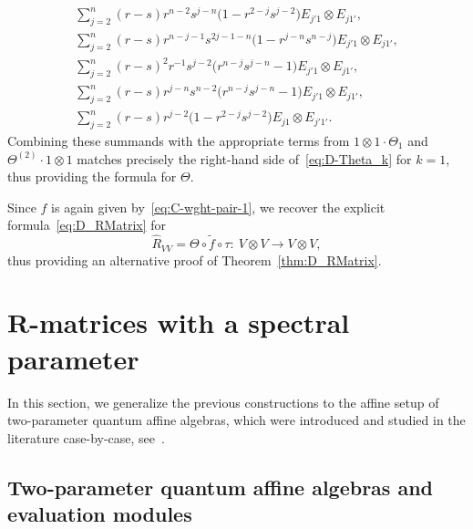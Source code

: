 \documentclass[10pt,a4paper]{amsart}
\numberwithin{equation}{section}
\begin{document}
\begin{gather*}
 \sum_{j = 2}^{n}(r - s)r^{n - 2}s^{j - n}\bigl(1 - r^{2-j}s^{j - 2}\bigr)E_{j'1} \otimes E_{j1'},
\\
 \sum_{j = 2}^{n}(r-s)r^{n- j- 1}s^{2j - 1 - n}\bigl(1 - r^{j-n}s^{n - j}\bigr)E_{j'1} \otimes E_{j1'},
\\
 \sum_{j = 2}^{n}(r - s)^{2}r^{-1}s^{j - 2}\bigl(r^{n - j}s^{j - n} - 1\bigr)E_{j'1} \otimes E_{j1'},
\\
 \sum_{j = 2}^{n}(r - s)r^{j - n}s^{n - 2}\bigl(r^{n-j}s^{j - n} - 1\bigr)E_{j'1} \otimes E_{j1'},
\\
 \sum_{j = 2}^{n}(r - s)r^{j - 2}\bigl(1 - r^{2 - j}s^{j - 2}\bigr)E_{j1} \otimes E_{j'1'}.
\end{gather*}
Combining these summands with the appropriate terms from $1 \otimes 1 \cdot \Theta_{1}$ and $\Theta^{(2)}\cdot 1\otimes 1$ matches precisely the right-hand side of~\eqref{eq:D-Theta_k} for $k=1$, thus providing the formula for $\Theta$.

Since $f$ is again given by~\eqref{eq:C-wght-pair-1}, we recover the explicit formula~\eqref{eq:D_RMatrix} for
\[
\hat{R}_{VV}=\Theta \circ \widetilde{f} \circ \tau\colon \ V \otimes V \to V \otimes V,
\]
 thus providing an alternative proof of Theorem~\ref{thm:D_RMatrix}.

\section[R-matrices with a spectral parameter]{$\boldsymbol{R}$-matrices with a spectral parameter}\label{sec:affine-R}

In this section, we generalize the previous constructions to the affine setup of two-parameter quantum affine algebras, which were introduced and studied in the literature case-by-case, see~\cite{GHZ, HRZ,HZ2,HZ1}.

\subsection{Two-parameter quantum affine algebras and evaluation modules}\label{ssec:2-param affine}
\end{document}
